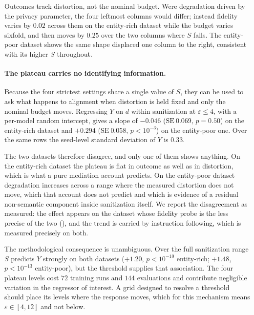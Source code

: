 Outcomes track distortion,
not the nominal budget.
Were degradation driven by the privacy parameter,
the four leftmost columns would differ;
instead fidelity varies by $0.02$ across them on the entity-rich dataset while the budget varies sixfold,
and then moves by $0.25$ over the two columns where $S$ falls.
The entity-poor dataset shows the same shape displaced one column to the right,
consistent with its higher $S$ throughout.

\paragraph{\label{apx:plateau}The plateau carries no identifying information.}
Because the four strictest settings share a single value of $S$,
they can be used to ask what happens to alignment when distortion is held fixed and only the nominal budget moves.
Regressing $Y$ on $d$ within sanitization at $\varepsilon \le 4$,
with a per-model random intercept,
gives a slope of $-0.046$ ($\mathrm{SE}\ 0.069$, $p = 0.50$) on the entity-rich dataset and $+0.294$ ($\mathrm{SE}\ 0.058$, $p < 10^{-3}$) on the entity-poor one.
Over the same rows the seed-level standard deviation of $Y$ is $0.33$.

The two datasets therefore disagree,
and only one of them shows anything.
On the entity-rich dataset the plateau is flat in outcome as well as in distortion,
which is what a pure mediation account predicts.
On the entity-poor dataset degradation increases across a range where the measured distortion does not move,
which that account does not predict and which is evidence of a residual non-semantic component inside sanitization itself.
We report the disagreement as measured:
the effect appears on the dataset whose fidelity probe is the less precise of the two (),
and the trend is carried by instruction following,
which is measured precisely on both.

The methodological consequence is unambiguous.
Over the full sanitization range $S$ predicts $Y$ strongly on both datasets ($+1.20$, $p < 10^{-10}$ entity-rich; $+1.48$, $p < 10^{-13}$ entity-poor),
but the threshold supplies that association.
The four plateau levels cost $72$ training runs and $144$ evaluations and contribute negligible variation in the regressor of interest.
A grid designed to resolve a threshold should place its levels where the response moves,
which for this mechanism means $\varepsilon \in [4, 12]$ and not below.

